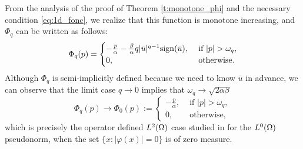 	From the analysis of the proof of Theorem \ref{t:monotone_phi} and the necessary condition \eqref{eq:1d_fonc}, we realize that this function is monotone increasing, and $\Phi_q$ can be written as follows:
	{%
		\begin{equation}\label{eq:Phi2}
			\Phi_q (p) =	
			\begin{cases}
				-\frac{p}{\alpha}-\frac{\beta}{\alpha} q |\bar u|^{q-1}\sign (\bar u), & \text{ if } |p|> \omega_q, \\
				0,                         &	\text{ otherwise.}
			\end{cases}
		\end{equation}
	}
	Although $\Phi_q$ is semi-implicitly defined because we need to know $\bar u$ in advance, we can observe that the limit case $q\to 0$  implies that $\omega_q \to \sqrt{2\alpha \beta}$
	\begin{equation*}
		\Phi_q (p)  \to 	\Phi_0(p):=
		\begin{cases}
			-\frac{p}{\alpha}, & \text{ if } |p|> \omega_q, \\
			0,                         &	\text{ otherwise,}
		\end{cases}
	\end{equation*}
	which is precisely the operator defined $L^2(\Omega)$ case studied in \cite{ito-kunisch2014} for the $L^0(\Omega)$ pseudonorm, when the set $\{x: |\varphi(x)|=0\}$ is of zero measure.
 
